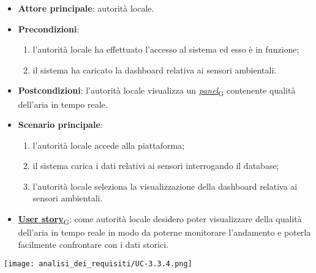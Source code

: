 \begin{itemize}
	\item \textbf{Attore principale}: autorità locale.
	\item \textbf{Precondizioni}:
	      \begin{enumerate}
		      \item l'autorità locale ha effettuato l'accesso al sistema ed esso è in funzione;
		      \item il sistema ha caricato la dashboard relativa ai sensori ambientali.
	      \end{enumerate}
	\item \textbf{Postcondizioni}: l'autorità locale visualizza un \href{https://7last.github.io/docs/pb/documentazione-interna/glossario\#panel}{\textit{panel}\textsubscript{G}} contenente qualità dell'aria in tempo reale.
	\item \textbf{Scenario principale}:
	      \begin{enumerate}
		      \item l'autorità locale accede alla piattaforma;
		      \item il sistema carica i dati relativi ai sensori interrogando il database;
		      \item l'autorità locale seleziona la visualizzazione della dashboard relativa ai sensori ambientali.
	      \end{enumerate}
	\item \href{https://7last.github.io/docs/pb/documentazione-interna/glossario\#user-story}{\textbf{User story}\textsubscript{G}}:
	      come autorità locale desidero poter visualizzare della qualità dell'aria in tempo reale in modo da poterne monitorare l'andamento
	      e poterla facilmente confrontare con i dati storici.
\end{itemize}
\begin{center}
	\texttt{[image: analisi\_dei\_requisiti/UC-3.3.4.png]}
\end{center}

